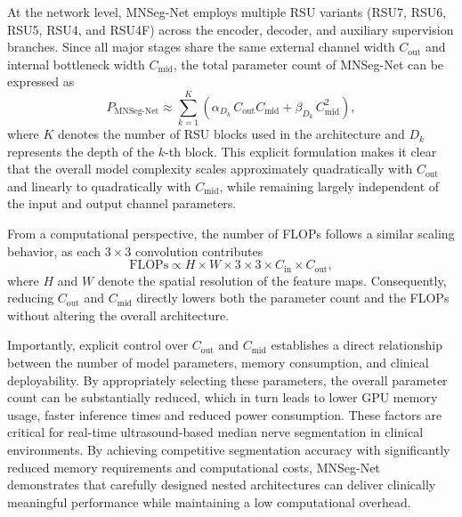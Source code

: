 \documentclass[12pt,letterpaper]{article}
\begin{document}
At the network level, MNSeg-Net employs multiple RSU variants (RSU7, RSU6, RSU5, RSU4, and RSU4F) across the encoder, decoder, and auxiliary supervision branches. Since all major stages share the same external channel width $C_{\text{out}}$ and internal bottleneck width $C_{\text{mid}}$, the total parameter count of MNSeg-Net can be expressed as
\begin{equation}
P_{\text{MNSeg-Net}} \approx \sum_{k=1}^{K} \left( \alpha_{D_k} \, C_{\text{out}} C_{\text{mid}} + \beta_{D_k} \, C_{\text{mid}}^2 \right),
\end{equation}
where $K$ denotes the number of RSU blocks used in the architecture and $D_k$ represents the depth of the $k$-th block. This explicit formulation makes it clear that the overall model complexity scales approximately quadratically with $C_{\text{out}}$ and linearly to quadratically with $C_{\text{mid}}$, while remaining largely independent of the input and output channel parameters.

From a computational perspective, the number of FLOPs follows a similar scaling behavior, as each $3 \times 3$ convolution contributes
\begin{equation}
\text{FLOPs} \propto H \times W \times 3 \times 3 \times C_{\text{in}} \times C_{\text{out}},
\end{equation}
where $H$ and $W$ denote the spatial resolution of the feature maps. Consequently, reducing $C_{\text{out}}$ and $C_{\text{mid}}$ directly lowers both the parameter count and the FLOPs without altering the overall architecture.



Importantly, explicit control over $C_{\text{out}}$ and $C_{\text{mid}}$ establishes a direct relationship between the number of model parameters, memory consumption, and clinical deployability. By appropriately selecting these parameters, the overall parameter count can be substantially reduced, which in turn leads to lower GPU memory usage, faster inference times and reduced power consumption. These factors are critical for real-time ultrasound-based median nerve segmentation in clinical environments. By achieving competitive segmentation accuracy with significantly reduced memory requirements and computational costs, MNSeg-Net demonstrates that carefully designed nested architectures can deliver clinically meaningful performance while maintaining a low computational overhead.
\end{document}
